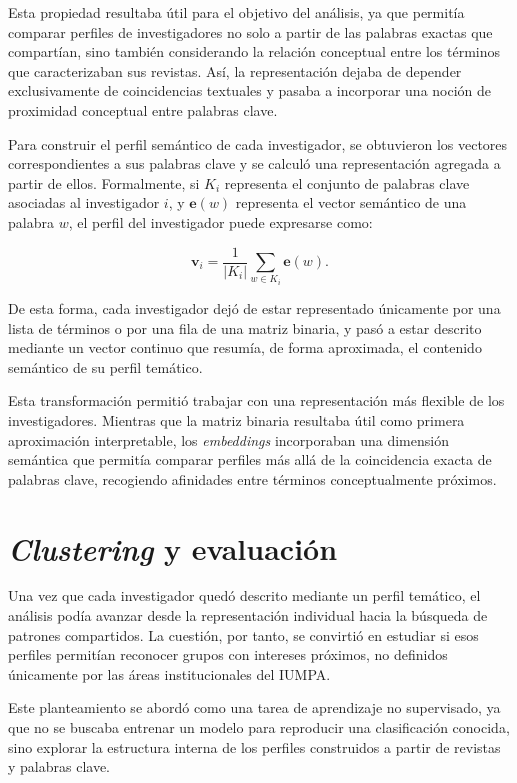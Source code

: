 \documentclass[11pt,spanish,listoffigures,listoftables]{tfgetsinf}
\begin{document}
Esta propiedad resultaba útil para el objetivo del análisis, ya que permitía comparar perfiles de investigadores no solo a partir de las palabras exactas que compartían, sino también considerando la relación conceptual entre los términos que caracterizaban sus revistas. Así, la representación dejaba de depender exclusivamente de coincidencias textuales y pasaba a incorporar una noción de proximidad conceptual entre palabras clave.

Para construir el perfil semántico de cada investigador, se obtuvieron los vectores correspondientes a sus palabras clave y se calculó una representación agregada a partir de ellos. Formalmente, si \(K_i\) representa el conjunto de palabras clave asociadas al investigador \(i\), y \(\mathbf{e}(w)\) representa el vector semántico de una palabra \(w\), el perfil del investigador puede expresarse como:

\[
\mathbf{v}_i = \frac{1}{|K_i|}\sum_{w \in K_i} \mathbf{e}(w).
\]

De esta forma, cada investigador dejó de estar representado únicamente por una lista de términos o por una fila de una matriz binaria, y pasó a estar descrito mediante un vector continuo que resumía, de forma aproximada, el contenido semántico de su perfil temático.

Esta transformación permitió trabajar con una representación más flexible de los investigadores. Mientras que la matriz binaria resultaba útil como primera aproximación interpretable, los \textit{embeddings} incorporaban una dimensión semántica que permitía comparar perfiles más allá de la coincidencia exacta de palabras clave, recogiendo afinidades entre términos conceptualmente próximos.

\section{\textit{Clustering} y evaluación}

Una vez que cada investigador quedó descrito mediante un perfil temático, el análisis podía avanzar desde la representación individual hacia la búsqueda de patrones compartidos. La cuestión, por tanto, se convirtió en estudiar si esos perfiles permitían reconocer grupos con intereses próximos, no definidos únicamente por las áreas institucionales del IUMPA.

Este planteamiento se abordó como una tarea de aprendizaje no supervisado, ya que no se buscaba entrenar un modelo para reproducir una clasificación conocida, sino explorar la estructura interna de los perfiles construidos a partir de revistas y palabras clave.
\end{document}
